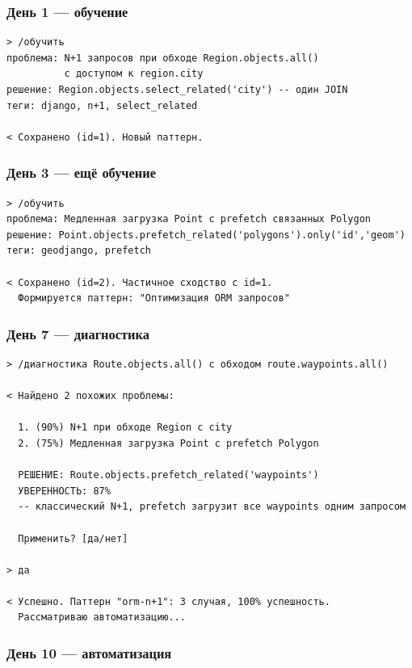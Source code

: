 \documentclass[12pt, a4paper, twoside]{article}
\begin{document}
\subsubsection{День 1 --- обучение}

\begin{lstlisting}[language={},numbers=none]
> /обучить
проблема: N+1 запросов при обходе Region.objects.all()
          с доступом к region.city
решение: Region.objects.select_related('city') -- один JOIN
теги: django, n+1, select_related

< Сохранено (id=1). Новый паттерн.
\end{lstlisting}

\subsubsection{День 3 --- ещё обучение}

\begin{lstlisting}[language={},numbers=none]
> /обучить
проблема: Медленная загрузка Point с prefetch связанных Polygon
решение: Point.objects.prefetch_related('polygons').only('id','geom')
теги: geodjango, prefetch

< Сохранено (id=2). Частичное сходство с id=1.
  Формируется паттерн: "Оптимизация ORM запросов"
\end{lstlisting}

\subsubsection{День 7 --- диагностика}

\begin{lstlisting}[language={},numbers=none]
> /диагностика Route.objects.all() с обходом route.waypoints.all()

< Найдено 2 похожих проблемы:

  1. (90%) N+1 при обходе Region с city
  2. (75%) Медленная загрузка Point с prefetch Polygon

  РЕШЕНИЕ: Route.objects.prefetch_related('waypoints')
  УВЕРЕННОСТЬ: 87%
  -- классический N+1, prefetch загрузит все waypoints одним запросом

  Применить? [да/нет]

> да

< Успешно. Паттерн "orm-n+1": 3 случая, 100% успешность.
  Рассматриваю автоматизацию...
\end{lstlisting}

\subsubsection{День 10 --- автоматизация}
\end{document}
